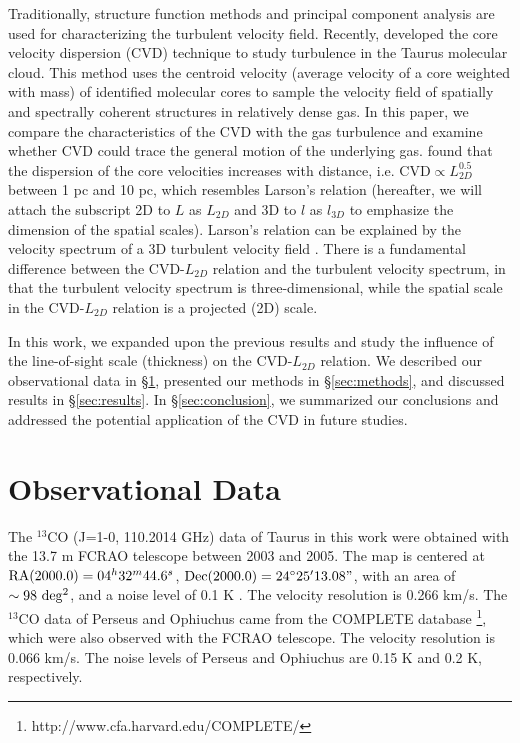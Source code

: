 \documentclass[iop,revtex4]{emulateapj}
\begin{document}
Traditionally, structure function methods \citep[e.g.][]{Turbulence_Brunt2002} and principal component analysis \cite[PCA,][]{Heyer1997,Brunt2003} are used for characterizing the turbulent velocity field. Recently, \cite{Qian2012} developed the core velocity dispersion (CVD) technique to study turbulence in the Taurus molecular cloud. This method uses the centroid velocity (average velocity of a core weighted with mass) of identified molecular cores to sample the velocity field of spatially and spectrally coherent structures in relatively dense gas. In this paper, we compare the characteristics of the CVD with the gas turbulence and examine whether CVD could trace the general motion  of the underlying gas. \cite{Qian2012} found that the dispersion of the core velocities increases with distance, i.e. CVD$\propto L_{2D}^{0.5}$ between 1 pc and 10 pc, which resembles Larson's relation (hereafter, we will attach the subscript 2D to $L$ as $L_{2D}$ and 3D to $l$ as $l_{3D}$ to emphasize the dimension of the spatial scales). Larson's relation can be explained by the velocity spectrum of a 3D turbulent velocity field \citep{Kritsuk2013}. There is a fundamental difference between the CVD-$L_{2D}$ relation and the turbulent velocity spectrum, in that the turbulent velocity spectrum is three-dimensional, while the spatial scale in the CVD-$L_{2D}$ relation is a projected (2D) scale.


In this work, we expanded upon the previous results and study the influence of the line-of-sight scale (thickness)
on the CVD-$L_{2D}$ relation. We described our observational data in \S\ref{sec:data},  presented our methods in \S\ref{sec:methods}, and discussed results in \S\ref{sec:results}. In \S\ref{sec:conclusion}, we summarized our conclusions and addressed the potential application of the CVD in future studies.


\section{Observational Data}
\label{sec:data}


The
$^{13}$CO (J=1-0, 110.2014 GHz) data of Taurus in this work were obtained with the 13.7 m FCRAO telescope between 2003 and 2005. The map is centered at ${\rm RA}(2000.0)=04^h 32^m 44.6^s$, ${\rm Dec}(2000.0)=24^\circ 25' 13.08"$, with an area of $\sim 98\ \rm
deg^2$, and a noise level of 0.1 K  \citep{Narayanan2008}.
The velocity resolution is 0.266 km/s. The $^{13}$CO data of Perseus and Ophiuchus came from the COMPLETE database \citep{Ridge2006}\footnote{http://www.cfa.harvard.edu/COMPLETE/}, which were also observed with the FCRAO telescope. The velocity resolution is 0.066 km/s. The noise levels of Perseus and Ophiuchus are 0.15 K and 0.2 K, respectively.
\end{document}
